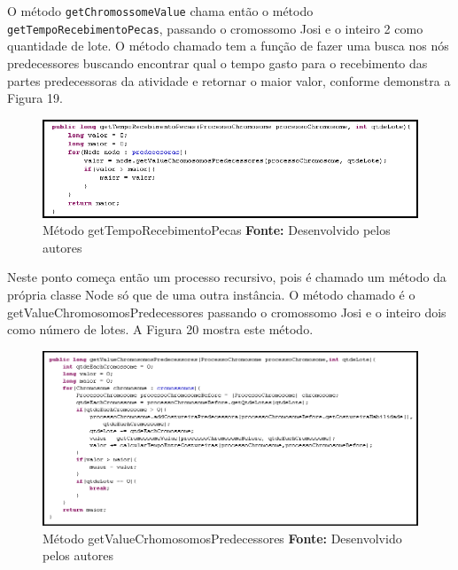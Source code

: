 \par O método \texttt{getChromossomeValue} chama então o método \texttt{getTempoRecebimentoPecas}, passando o cromossomo Josi e 
o inteiro 2 como quantidade de lote. O método chamado tem a função de fazer uma busca nos nós predecessores buscando encontrar 
qual o tempo gasto para o recebimento das partes predecessoras da atividade e retornar o maior valor, conforme demonstra a Figura 19.

\begin{figure}[h!]
	\centerline{\includegraphics[scale=0.8]{./imagens/metodo_getTempoRecebimentoPecas.png}}
	\caption[Distribuição de trabalho]
	{Método getTempoRecebimentoPecas \textbf{Fonte:} Desenvolvido pelos autores}
	\label{fig:exemplo1}
\end{figure}

\newpage

\par Neste ponto começa então um processo recursivo, pois é chamado um método da própria classe Node só que de uma outra instância.
O método chamado é o getValueChromosomosPredecessores passando o cromossomo Josi e o inteiro dois como número de lotes. A Figura
20 mostra este método.

\begin{figure}[h!]
	\centerline{\includegraphics[scale=0.7]{./imagens/metodo_getValueCrhomosomosPredecessores.png}}
	\caption[Distribuição de trabalho]
	{Método getValueCrhomosomosPredecessores \textbf{Fonte:} Desenvolvido pelos autores}
	\label{fig:exemplo1}
\end{figure}

